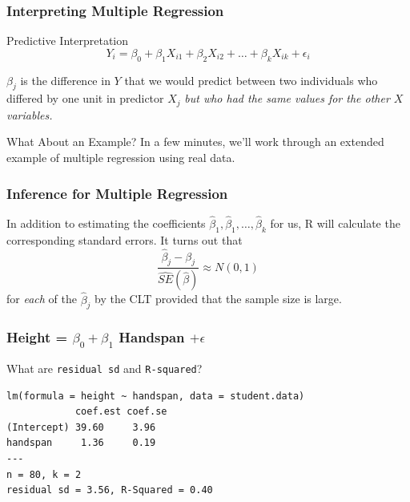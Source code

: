 \documentclass{beamer}
\begin{document}

\begin{frame}
\frametitle{Interpreting Multiple Regression}

\begin{block}{Predictive Interpretation}
$$Y_i = \beta_0 + \beta_1 X_{i1} + \beta_2 X_{i2} +  \hdots + \beta_k X_{ik} + \epsilon_i$$

$\beta_j$ is the difference in $Y$ that we would predict between two individuals who differed by one unit in predictor $X_j$ \emph{\alert{but who had the same values for the other $X$ variables.}} 

\end{block}

\begin{block}{What About an Example?}
	In a few minutes, we'll work through an extended example of multiple regression using real data.
\end{block}
\end{frame}

\begin{frame}
\frametitle{Inference for Multiple Regression}

In addition to estimating the coefficients $\widehat{\beta}_1, \widehat{\beta}_1, \hdots, \widehat{\beta}_k$ for us, R will calculate the corresponding standard errors. It turns out that
	$$\frac{\widehat{\beta}_j - \beta_j}{\widehat{SE}(\widehat{\beta})} \approx N(0,1)$$
for \emph{each} of the $\widehat{\beta}_j$ by the CLT provided that the sample size is large.

\end{frame}

\begin{frame}[fragile]
\frametitle{Height = $\beta_0 + \beta_1$ Handspan $+ \epsilon$}
\alert{What are \texttt{residual sd} and \texttt{R-squared}?}
\footnotesize
\begin{verbatim}
lm(formula = height ~ handspan, data = student.data)
            coef.est coef.se
(Intercept) 39.60     3.96  
handspan     1.36     0.19  
---
n = 80, k = 2
residual sd = 3.56, R-Squared = 0.40
\end{verbatim}
\end{frame}
\end{document}
